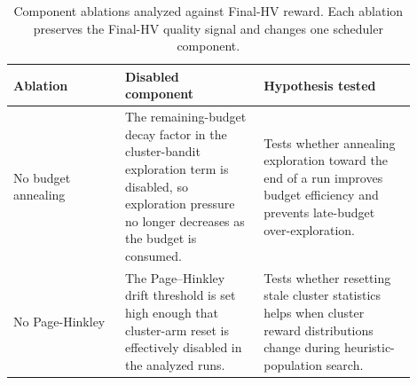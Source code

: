 \begin{table}[H]
\centering
\caption[Component ablation settings]{Component ablations analyzed against Final-HV reward. Each ablation preserves the Final-HV quality signal and changes one scheduler component.}
\label{tab:ablation-settings}
\small
\setlength{\tabcolsep}{5pt}
\begin{tabular}{p{0.25\linewidth}p{0.31\linewidth}p{0.34\linewidth}}
\toprule
Ablation & Disabled component & Hypothesis tested \\
\midrule
No budget annealing & The remaining-budget decay factor in the cluster-bandit exploration term is disabled, so exploration pressure no longer decreases as the budget is consumed. & Tests whether annealing exploration toward the end of a run improves budget efficiency and prevents late-budget over-exploration. \\
No Page-Hinkley & The Page--Hinkley drift threshold is set high enough that cluster-arm reset is effectively disabled in the analyzed runs. & Tests whether resetting stale cluster statistics helps when cluster reward distributions change during heuristic-population search. \\
\bottomrule
\end{tabular}
\end{table}
